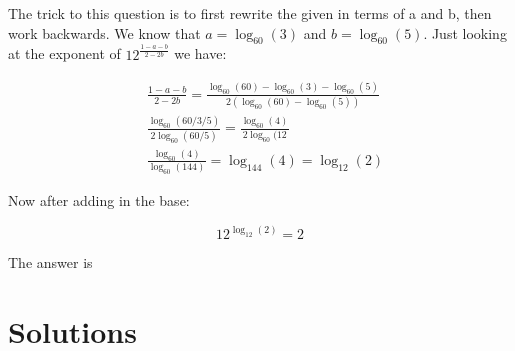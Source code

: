 \begin{solution}
  
The trick to this question is to first rewrite the given in terms of a and b, then work backwards. We know that $a=\log_{60}(3)$ and $b=\log_{60}(5)$. Just looking at the exponent of 
$12^{\frac{1-a-b}{2-2b}}$ we have:

\begin{equation*}
  \begin{aligned}
  & \frac{1-a-b}{2-2b} = 
    \frac{\log_{60}(60)-\log_{60}(3)-\log_{60}(5)}
         {2(\log_{60}(60)-\log_{60}(5))}\\
  & \frac{\log_{60}(60/3/5)}{2\log_{60}(60/5)} = \frac{\log_{60}(4)}{2\log_{60}(12} \\
  & \frac{\log_{60}(4)}{\log_{60}(144)} = \log_{144}(4) = \log_{12}(2)
  \end{aligned}
\end{equation*}

Now after adding in the base:

$$
  12^{\log_{12}(2)} = 2
$$

The answer is 

\end{solution}


\newpage
\section{Solutions}


\printsolutions